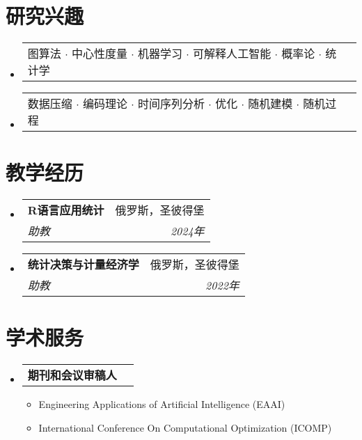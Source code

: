 \documentclass[letterpaper,10pt]{ctexart}
\makeatletter
\newcommand{\resumeItem}[1]{
  \item\small{
    {#1 \vspace{-2pt}}
  }
}
\newcommand{\resumeSubheading}[4]{
  \vspace{-2pt}\item
  \begin{tabular*}{0.97\textwidth}[t]{l@{\extracolsep{\fill}}r}
    \textbf{#1} & #2 \\
    \textit{\small#3} & \textit{\small #4} \\
  \end{tabular*}\vspace{-7pt}
}
\newcommand{\resumeProjectHeading}[2]{
  \item
  \begin{tabular*}{0.97\textwidth}{l@{\extracolsep{\fill}}r}
    \small#1 & #2 \\
  \end{tabular*}\vspace{-7pt}
}
\newenvironment{resumeSubHeadingList}{\begin{itemize}[leftmargin=0.15in, label={}]}{\end{itemize}}
\newenvironment{resumeItemList}{\begin{itemize}}{\end{itemize}}
\makeatother
\begin{document}
\section{研究兴趣}
\begin{resumeSubHeadingList}
  \resumeProjectHeading{
    图算法 $\cdot$ 中心性度量 $\cdot$ 机器学习
    $\cdot$ 可解释人工智能 $\cdot$ 概率论
    $\cdot$ 统计学}{}
  \resumeProjectHeading{
    数据压缩 $\cdot$ 编码理论 $\cdot$ 时间序列分析 $\cdot$
    优化 $\cdot$ 随机建模 $\cdot$ 随机过程}{}
\end{resumeSubHeadingList}
\section{教学经历}
\begin{resumeSubHeadingList}
  \resumeSubheading{R语言应用统计}{俄罗斯，圣彼得堡}{助教}{2024年}
  \resumeSubheading{统计决策与计量经济学}{俄罗斯，圣彼得堡}{助教}{2022年}
\end{resumeSubHeadingList}

\section{学术服务}
\begin{resumeSubHeadingList}
  \resumeProjectHeading{{\bf 期刊和会议审稿人}}{}
  \begin{resumeItemList}
    \resumeItem{Engineering Applications of Artificial Intelligence (EAAI)}
    \resumeItem{International Conference On Computational Optimization (ICOMP)}
  \end{resumeItemList}
\end{resumeSubHeadingList}
\end{document}
